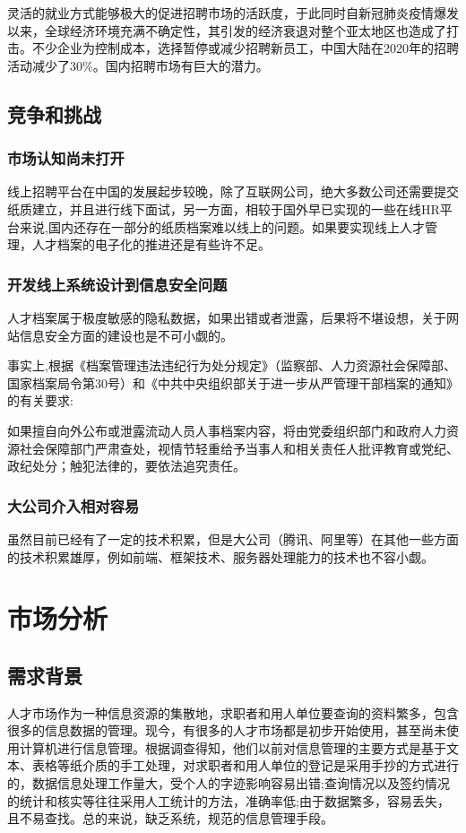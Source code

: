\documentclass[UTF8]{ctexart}
\begin{document}
灵活的就业方式能够极大的促进招聘市场的活跃度，于此同时自新冠肺炎疫情爆发以来，全球经济环境充满不确定性，其引发的经济衰退对整个亚太地区也造成了打击。不少企业为控制成本，选择暂停或减少招聘新员工，中国大陆在2020年的招聘活动减少了30\%。国内招聘市场有巨大的潜力。
\subsection{竞争和挑战}
\subsubsection{市场认知尚未打开}
线上招聘平台在中国的发展起步较晚，除了互联网公司，绝大多数公司还需要提交纸质建立，并且进行线下面试，另一方面，相较于国外早已实现的一些在线HR平台来说,国内还存在一部分的纸质档案难以线上的问题。如果要实现线上人才管理，人才档案的电子化的推进还是有些许不足。
\subsubsection{开发线上系统设计到信息安全问题}
人才档案属于极度敏感的隐私数据，如果出错或者泄露，后果将不堪设想，关于网站信息安全方面的建设也是不可小觑的。

事实上,根据《档案管理违法违纪行为处分规定》（监察部、人力资源社会保障部、国家档案局令第30号）和《中共中央组织部关于进一步从严管理干部档案的通知》的有关要求:

如果擅自向外公布或泄露流动人员人事档案内容，将由党委组织部门和政府人力资源社会保障部门严肃查处，视情节轻重给予当事人和相关责任人批评教育或党纪、政纪处分；触犯法律的，要依法追究责任。
\subsubsection{大公司介入相对容易}
虽然目前已经有了一定的技术积累，但是大公司（腾讯、阿里等）在其他一些方面的技术积累雄厚，例如前端、框架技术、服务器处理能力的技术也不容小觑。
\newpage\section{市场分析}
\subsection{需求背景}
人才市场作为一种信息资源的集散地，求职者和用人单位要查询的资料繁多，包含很多的信息数据的管理。现今，有很多的人才市场都是初步开始使用，甚至尚未使用计算机进行信息管理。根据调查得知，他们以前对信息管理的主要方式是基于文本、表格等纸介质的手工处理，对求职者和用人单位的登记是采用手抄的方式进行的，数据信息处理工作量大，受个人的字迹影响容易出错;查询情况以及签约情况的统计和核实等往往采用人工统计的方法，准确率低;由于数据繁多，容易丢失，且不易查找。总的来说，缺乏系统，规范的信息管理手段。
\end{document}
